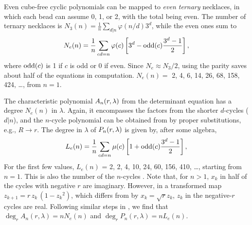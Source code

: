 \documentclass{ws-ijbc}
\begin{document}
Even cube-free cyclic polynomials
can be mapped to \emph{even ternary} necklaces,
in which each bead can assume
0, 1, or 2, with the total being even.
%
The number of ternary necklaces is
$N_3(n) = \frac{1}{n} \sum_{d|n} \varphi(n/d) 3^d$,
while the even ones sum to
\begin{equation}
  N_e(n) = \frac{1}{n} \sum_{c d = n} \varphi(c)
    \left[
      3^d - \mathrm{odd}(c) \frac{3^d-1}{2}
    \right],
\label{eq:cubnecklace}
\end{equation}
where
$\mathrm{odd}(c)$ %
is 1 if $c$ is odd or 0 if even.
%
Since $N_e \approx N_3/2$, using the parity saves about half of the equations
  in computation.
%
$N_e(n) = $ 2, 4, 6, 14, 26, 68, 158, 424, \dots, from $n = 1$.
%



The characteristic polynomial $A_n(r, \lambda)$
  from the determinant equation
  has a degree $N_e(n)$ in $\lambda$.
Again, it encompasses the factors
  from the shorter $d$-cycles ($d|n$),
  and the $n$-cycle polynomial can be obtained
  from  by proper substitutions, e.g.,
  $R\rightarrow r$.
The degree in $\lambda$ of $P_n(r, \lambda)$
  is given by, after some algebra,
%
%
\begin{equation}
  L_e(n) = \frac{1}{n} \sum_{cd = n} \mu(c)
    \left[
      1 + \mathrm{odd}(c)\frac{3^d-1}{2}
    \right],
\label{eq:cublyndon}
\end{equation}
%
%
For the first few values,
  $L_e(n)$ = 2, 2, 4, 10, 24, 60, 156, 410, \ldots, starting from $n = 1$.
%
This is also the number of the $n$-cycles \cite{hao, hao2}.
Note that, for $n>1$, $x_k$ in half of the cycles
  with negative $r$ are imaginary.
However, in a transformed map
$z_{k+1} = r \, z_k \, (1 - {z_k}^2)$,
which differs from  by $x_k = \sqrt{r} z_k$,
$z_k$ in the negative-$r$ cycles are real.
%
%
Following similar steps in ,
we find that
  $\deg_r A_n(r, \lambda) = n N_e(n)$
  and $\deg_r P_n(r, \lambda) = n L_e(n)$.



\end{document}
